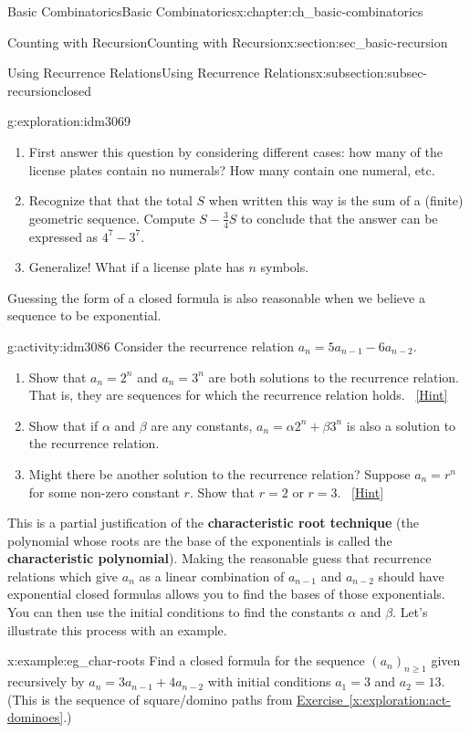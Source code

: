 \documentclass[oneside,10pt,]{book}
\newcommand{\terminology}[1]{\textbf{#1}}
\numberwithin{equation}{chapter}
\begin{document}
\begin{chapterptx}{Basic Combinatorics}{}{Basic Combinatorics}{}{}{x:chapter:ch_basic-combinatorics}
\begin{sectionptx}{Counting with Recursion}{}{Counting with Recursion}{}{}{x:section:sec_basic-recursion}
\begin{subsectionptx}{Using Recurrence Relations}{}{Using Recurrence Relations}{}{}{x:subsection:subsec-recursionclosed}
\begin{exploration}{}{g:exploration:idm3069}
\begin{enumerate}[font=\bfseries,label=(\alph*),ref=\alph*]
\item{}First answer this question by considering different cases: how many of the license plates contain no numerals?  How many contain one numeral, etc.%
\item{}Recognize that that the total \(S\) when written this way is the sum of a (finite) geometric sequence.  Compute \(S - \frac{3}{4}S\) to conclude that the answer can be expressed as \(4^7 - 3^7\).%
\item{}Generalize! What if a license plate has \(n\) symbols.%
\end{enumerate}
\end{exploration}
Guessing the form of a closed formula is also reasonable when we believe a sequence to be exponential.%
\begin{activity}{}{g:activity:idm3086}%
Consider the recurrence relation \(a_n = 5a_{n-1} - 6a_{n-2}\).%
\begin{enumerate}[font=\bfseries,label=(\alph*),ref=\alph*]
\item{}Show that \(a_n = 2^n\) and \(a_n = 3^n\) are both solutions to the recurrence relation.  That is, they are sequences for which the recurrence relation holds.%
\qquad~\hfill{\tiny\hyperlink{g:hint:idm3095-back}{[Hint]}}\item{}Show that if \(\alpha\) and \(\beta\) are any constants, \(a_n = \alpha 2^n + \beta 3^n\) is also a solution to the recurrence relation.%
\item{}Might there be another solution to the recurrence relation?  Suppose \(a_n = r^n\) for some non-zero constant \(r\).  Show that \(r = 2\) or \(r = 3\).%
\qquad~\hfill{\tiny\hyperlink{g:hint:idm3110-back}{[Hint]}}\end{enumerate}
\end{activity}
This is a partial justification of the \terminology{characteristic root technique} (the polynomial whose roots are the base of the exponentials is called the \terminology{characteristic polynomial}).  Making the reasonable guess that recurrence relations which give \(a_n\) as a linear combination of \(a_{n-1}\) and \(a_{n-2}\) should have exponential closed formulas allows you to find the bases of those exponentials.  You can then use the initial conditions to find the constants \(\alpha\) and \(\beta\).  Let's illustrate this process with an example.%
\begin{example}{}{x:example:eg_char-roots}%
Find a closed formula for the sequence \((a_n)_{n \ge 1}\) given recursively by \(a_n = 3a_{n-1} + 4a_{n-2}\) with initial conditions \(a_1 = 3\) and \(a_2 = 13\).  (This is the sequence of square\slash{}domino paths from \hyperref[x:exploration:act-dominoes]{Exercise~\ref{x:exploration:act-dominoes}}.)%

\end{example}
\end{subsectionptx}
\end{sectionptx}
\end{chapterptx}
\end{document}
